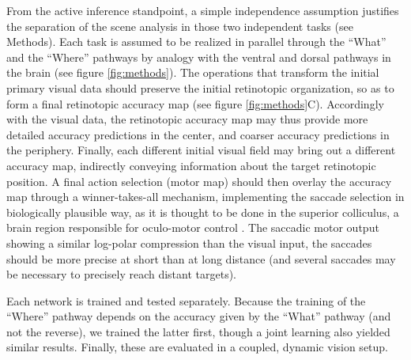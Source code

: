 From the active inference standpoint, a simple independence assumption  justifies the separation of the scene analysis in those two independent tasks (see Methods). %
Each task is assumed to be realized in parallel through  the ``What'' and the ``Where'' pathways by analogy with the ventral and dorsal pathways in the brain (see figure \ref{fig:methods}).
The operations that transform the initial primary visual data should preserve the initial retinotopic organization, so as to form a final retinotopic accuracy map (see figure \ref{fig:methods}C). Accordingly with the visual data, the retinotopic accuracy map may thus provide more detailed accuracy predictions in the center, and coarser accuracy predictions in the periphery.
Finally, each different initial visual field may bring out a different accuracy map, indirectly conveying information about the target retinotopic position.
A final action selection (motor map) should then overlay the accuracy map through a winner-takes-all mechanism, implementing the saccade selection in biologically plausible way, as it is thought to be done in the superior colliculus, a brain region responsible for oculo-motor control \cite{sparks1987sensory}.
The saccadic motor output showing a similar log-polar compression than the visual input, the saccades should be more precise at short than at long distance (and several saccades may be necessary to precisely reach distant targets).

Each network is trained and tested separately. Because the training of the ``Where'' pathway depends on the accuracy given by the ``What'' pathway (and not the reverse), we trained the latter first, though a joint learning also yielded similar results. %
Finally, these are evaluated in a coupled, dynamic vision setup.




